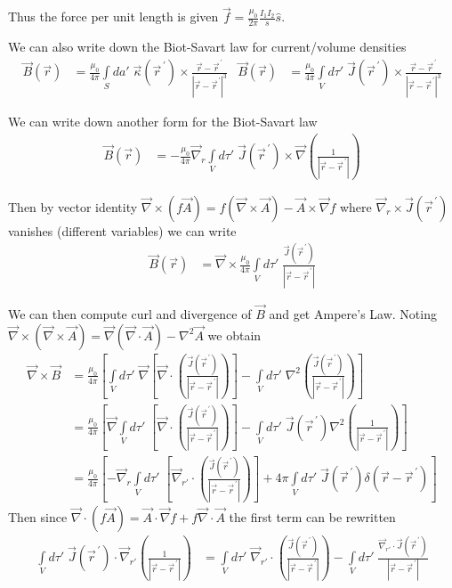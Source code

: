 \documentclass[10pt]{report}
\newcommand{\pvec}[1]{\vec{#1}^{\,\prime}}
\newcommand{\abs}[1]{\left|#1\right|}
\begin{document}
Thus the force per unit length is given $\vec{f} = \frac{\mu_0}{2\pi}\frac{I_1I_2}{s}\hat{s}$. 

We can also write down the Biot-Savart law for current/volume densities
\begin{align}
    \vec{B}(\vec{r}) &= \frac{\mu_0}{4\pi}\int\limits_{S}^{}da'\;\vec{\kappa}(\pvec{r}) \times \frac{\vec{r} - \pvec{r}}{\abs{\vec{r} - \pvec{r}}^3} & \vec{B}(\vec{r}) &= \frac{\mu_0}{4\pi}\int\limits_{V}^{}d\tau'\;\vec{J}(\pvec{r}) \times \frac{\vec{r} - \pvec{r}}{\abs{\vec{r} - \pvec{r}}^3}
\end{align}

We can write down another form for the Biot-Savart law
\begin{align}
    \vec{B}(\vec{r}) &= -\frac{\mu_0}{4\pi} \vec{\nabla}_r \int\limits_{V}^{}d\tau'\;\vec{J}(\pvec{r}) \times \vec{\nabla}\left( \frac{1}{\abs{\vec{r} - \pvec{r}}} \right)
\end{align}

Then by vector identity $\vec{\nabla}\times(f\vec{A}) = f(\vec{\nabla}\times \vec{A}) - \vec{A}\times \vec{\nabla}f$ where $\vec{\nabla}_r \times\vec{J}(\pvec{r})$ vanishes (different variables) we can write
\begin{align}
    \vec{B}(\vec{r}) &=  \vec{\nabla} \times \frac{\mu_0}{4\pi}\int\limits_{V}^{}d\tau'\;\frac{\vec{J}(\pvec{r})}{\abs{\vec{r} - \pvec{r}}}
\end{align}

We can then compute curl and divergence of $\vec{B}$ and get Ampere's Law. Noting $\vec{\nabla}\times(\vec{\nabla}\times\vec{A}) = \vec{\nabla}(\vec{\nabla}\cdot\vec{A}) - \nabla^2\vec{A}$ we obtain
\begin{align}
    \vec{\nabla}\times\vec{B} &= \frac{\mu_0}{4\pi}\left[ \int\limits_{V}^{}d\tau'\;\vec{\nabla}\left[ \vec{\nabla}\cdot\left( \frac{\vec{J}(\pvec{r})}{\abs{\vec{r} - \pvec{r}}} \right) \right] - \int\limits_{V}^{}d\tau'\;\nabla^2\left( \frac{\vec{J}(\pvec{r})}{\abs{\vec{r} - \pvec{r}}} \right) \right]\\
    &= \frac{\mu_0}{4\pi}\left[ \vec{\nabla}\int\limits_{V}^{}d\tau'\;\left[ \vec{\nabla}\cdot\left( \frac{\vec{J}(\pvec{r})}{\abs{\vec{r} - \pvec{r}}} \right) \right] - \int\limits_{V}^{}d\tau'\;\vec{J}(\pvec{r})\nabla^2\left( \frac{1}{\abs{\vec{r} - \pvec{r}}} \right) \right]\\
    &= \frac{\mu_0}{4\pi}\left[ -\vec{\nabla}_r\int\limits_{V}^{}d\tau'\;\left[ \vec{\nabla}_{r'}\cdot\left( \frac{\vec{J}(\pvec{r})}{\abs{\vec{r} - \pvec{r}}} \right) \right] +4\pi \int\limits_{V}^{}d\tau'\;\vec{J}(\pvec{r})\delta\left( \vec{r} - \pvec{r} \right) \right]
\end{align}
Then since $\vec{\nabla}\cdot(f\vec{A}) = \vec{A}\cdot \vec{\nabla}f + f\vec{\nabla}\cdot\vec{A}$ the first term can be rewritten
\begin{align}
    \int\limits_{V}^{}d\tau'\;\vec{J}(\pvec{r}) \cdot \vec{\nabla}_{r'}\left( \frac{1}{\abs{\vec{r} - \pvec{r}}} \right) &= \int\limits_{V}^{}d\tau'\;\vec{\nabla}_{r'}\cdot\left( \frac{\vec{J}(\pvec{r})}{\abs{\vec{r} - \pvec{r}}} \right) - \int\limits_{V}^{}d\tau'\;\frac{\vec{\nabla}_{r'}\cdot\vec{J}(\pvec{r})}{\abs{\vec{r} - \pvec{r}}}
\end{align}
\end{document}
